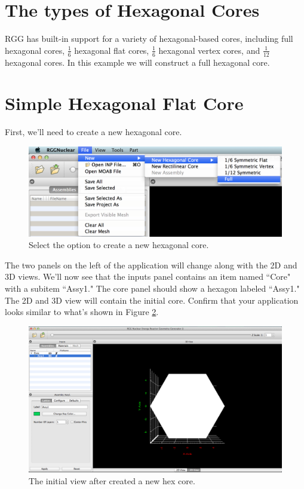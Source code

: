 \section{The types of Hexagonal Cores}

RGG has built-in support for a variety of hexagonal-based cores, including full hexagonal cores, $\frac{1}{6}$ hexagonal flat cores, $\frac{1}{6}$ hexagonal vertex cores, and $\frac{1}{12}$ hexagonal cores.  In this example we will construct a full hexagonal core.

\section{Simple Hexagonal Flat Core}

First, we'll need to create a new hexagonal core.

\begin{figure}[H]
	\begin{center}
		\includegraphics[width=0.5\linewidth]{Images/hex-new.png}
		\caption{Select the option to create a new hexagonal core.}
		\label{fig:Hex1}
	\end{center}
\end{figure}

The two panels on the left of the application will change along with the 2D and 3D views.  We'll now see that the inputs panel contains an item named ``Core" with a subitem ``Assy1."  The core panel should show a hexagon labeled ``Assy1."  The 2D and 3D view will contain the initial core. Confirm that your application looks similar to what's shown in Figure \ref{fig:Hex2}.

\begin{figure}[H]
	\begin{center}
		\includegraphics[width=0.5\linewidth]{Images/hex-new-init.png}
		\caption{The initial view after created a new hex core.}
		\label{fig:Hex2}
	\end{center}
\end{figure}


